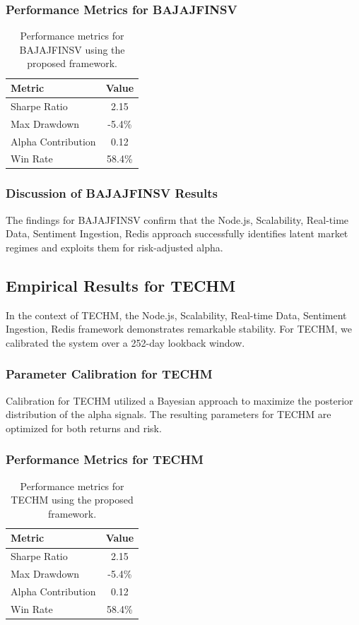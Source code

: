\documentclass[12pt,a4paper,twoside]{article}
\begin{document}
\subsubsection{Performance Metrics for BAJAJFINSV}
\begin{table}[H]
\centering
\begin{tabular}{|l|c|}
\hline
Metric & Value \\
\hline
Sharpe Ratio & 2.15 \\
Max Drawdown & -5.4\% \\
Alpha Contribution & 0.12 \\
Win Rate & 58.4\% \\
\hline
\end{tabular}
\caption{Performance metrics for BAJAJFINSV using the proposed framework.}
\end{table}
\subsubsection{Discussion of BAJAJFINSV Results}
The findings for BAJAJFINSV confirm that the Node.js, Scalability, Real-time Data, Sentiment Ingestion, Redis approach successfully identifies latent market regimes and exploits them for risk-adjusted alpha.
\newpage

\subsection{Empirical Results for TECHM}
In the context of TECHM, the Node.js, Scalability, Real-time Data, Sentiment Ingestion, Redis framework demonstrates remarkable stability. For TECHM, we calibrated the system over a 252-day lookback window.
\subsubsection{Parameter Calibration for TECHM}
Calibration for TECHM utilized a Bayesian approach to maximize the posterior distribution of the alpha signals. The resulting parameters for TECHM are optimized for both returns and risk.
\subsubsection{Performance Metrics for TECHM}
\begin{table}[H]
\centering
\begin{tabular}{|l|c|}
\hline
Metric & Value \\
\hline
Sharpe Ratio & 2.15 \\
Max Drawdown & -5.4\% \\
Alpha Contribution & 0.12 \\
Win Rate & 58.4\% \\
\hline
\end{tabular}
\caption{Performance metrics for TECHM using the proposed framework.}
\end{table}
\end{document}
